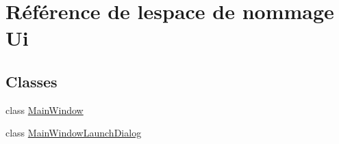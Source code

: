 \hypertarget{namespaceUi}{}\section{Référence de l\textquotesingle{}espace de nommage Ui}
\label{namespaceUi}
\subsection*{Classes}
\begin{DoxyCompactItemize}
\item 
class \hyperlink{classUi_1_1MainWindow}{Main\+Window}
\item 
class \hyperlink{classUi_1_1MainWindowLaunchDialog}{Main\+Window\+Launch\+Dialog}
\end{DoxyCompactItemize}
